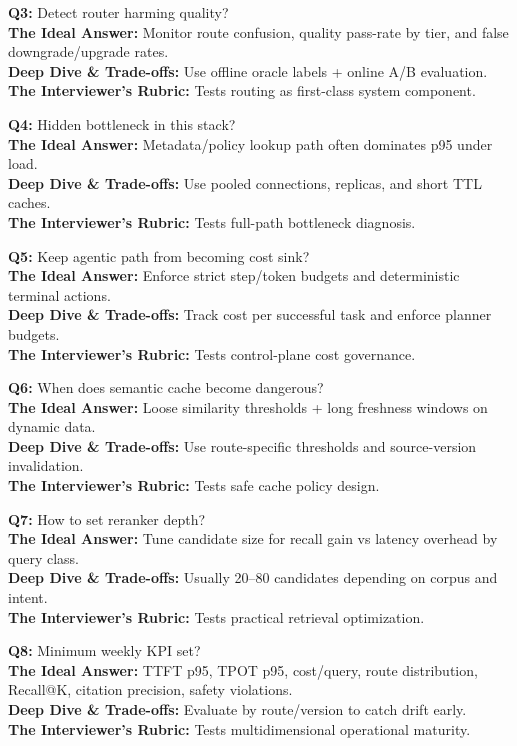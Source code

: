 \textbf{Q3:} Detect router harming quality?\\
\textbf{The Ideal Answer:} Monitor route confusion, quality pass-rate by tier, and false downgrade/upgrade rates.\\
\textbf{Deep Dive \& Trade-offs:} Use offline oracle labels + online A/B evaluation.\\
\textbf{The Interviewer's Rubric:} Tests routing as first-class system component.

\textbf{Q4:} Hidden bottleneck in this stack?\\
\textbf{The Ideal Answer:} Metadata/policy lookup path often dominates p95 under load.\\
\textbf{Deep Dive \& Trade-offs:} Use pooled connections, replicas, and short TTL caches.\\
\textbf{The Interviewer's Rubric:} Tests full-path bottleneck diagnosis.

\textbf{Q5:} Keep agentic path from becoming cost sink?\\
\textbf{The Ideal Answer:} Enforce strict step/token budgets and deterministic terminal actions.\\
\textbf{Deep Dive \& Trade-offs:} Track cost per successful task and enforce planner budgets.\\
\textbf{The Interviewer's Rubric:} Tests control-plane cost governance.

\textbf{Q6:} When does semantic cache become dangerous?\\
\textbf{The Ideal Answer:} Loose similarity thresholds + long freshness windows on dynamic data.\\
\textbf{Deep Dive \& Trade-offs:} Use route-specific thresholds and source-version invalidation.\\
\textbf{The Interviewer's Rubric:} Tests safe cache policy design.

\textbf{Q7:} How to set reranker depth?\\
\textbf{The Ideal Answer:} Tune candidate size for recall gain vs latency overhead by query class.\\
\textbf{Deep Dive \& Trade-offs:} Usually 20--80 candidates depending on corpus and intent.\\
\textbf{The Interviewer's Rubric:} Tests practical retrieval optimization.

\textbf{Q8:} Minimum weekly KPI set?\\
\textbf{The Ideal Answer:} TTFT p95, TPOT p95, cost/query, route distribution, Recall@K, citation precision, safety violations.\\
\textbf{Deep Dive \& Trade-offs:} Evaluate by route/version to catch drift early.\\
\textbf{The Interviewer's Rubric:} Tests multidimensional operational maturity.

